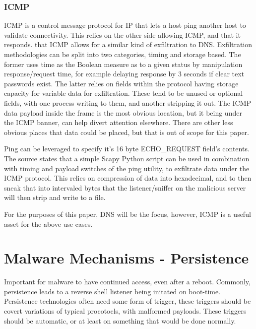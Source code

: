 \subsection{ICMP}
ICMP is a control message protocol for IP that lets a host ping another host to validate connectivity. This relies on the other side allowing ICMP, and that it responds. that ICMP allows for a similar kind of exfiltration to DNS. Exfiltration methodologies can be split into two categories, timing and storage based. The former uses time as the Boolean measure as to a given status by manipulation response/request time, for example delaying response by 3 seconds if clear text passwords exist.
The latter relies on fields within the protocol having storage capacity for variable data for exfiltration. These tend to be unused or optional fields, with one process writing to them, and another stripping it out. The ICMP data payload inside the frame is the most obvious location, but it being under the ICMP banner, can help divert attention elsewhere. There are other less obvious places that data could be placed, but that is out of scope for this paper. \citep{ICMPExfiltration}

Ping can be leveraged to specify it's 16 byte ECHO\_REQUEST field's contents. The source states that a simple Scapy Python script can be used in combination with timing and payload switches of the ping utility, to exfiltrate data under the ICMP protocol. This relies on compression of data into hexadecimal, and to then sneak that into intervaled bytes that the listener/sniffer on the malicious server will then strip and write to a file. \citep{pingExfil}

For the purposes of this paper, DNS will be the focus, however, ICMP is a useful asset for the above use cases.




\chapter{Malware Mechanisms - Persistence}
Important for malware to have continued access, even after a reboot. Commonly, persistence leads to a reverse shell listener being initated on boot-time.
Persistence technologies often need some form of trigger, these triggers should be covert variations of typical procotocls, with malformed payloads. These triggers should be automatic, or at least on something that would be done normally.

